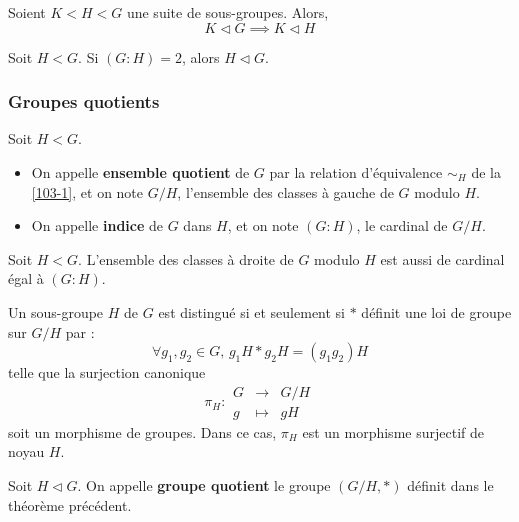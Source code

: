 	
	\begin{proposition}
		Soient $K < H < G$ une suite de sous-groupes. Alors,
		\[ K \lhd G \implies K \lhd H \]
	\end{proposition}
	
	
	\begin{proposition}
		Soit $H < G$. Si $(G:H) = 2$, alors $H \lhd G$.
	\end{proposition}
	
	\subsubsection{Groupes quotients}
	
	
	\begin{definition}
		Soit $H < G$.
		\begin{itemize}
			\item On appelle \textbf{ensemble quotient} de $G$ par la relation d'équivalence $\sim_H$ de la \cref{103-1}, et on note $G/H$, l'ensemble des classes à gauche de $G$ modulo $H$.
			\item On appelle \textbf{indice} de $G$ dans $H$, et on note $(G:H)$, le cardinal de $G/H$.
		\end{itemize}
	\end{definition}
	
	\begin{proposition}
		Soit $H < G$. L'ensemble des classes à droite de $G$ modulo $H$ est aussi de cardinal égal à $(G:H)$.
	\end{proposition}
	
	
	\begin{theorem}
		Un sous-groupe $H$ de $G$ est distingué si et seulement si $*$ définit une loi de groupe sur $G/H$ par :
		\[ \forall g_1, g_2 \in G, \, g_1 H * g_2 H = (g_1 g_2) H \]
		telle que la surjection canonique
		\[
			\pi_H :
			\begin{array}{ccc}
				G &\rightarrow& G/H \\
				g &\mapsto& gH
			\end{array}
		\]
		soit un morphisme de groupes. Dans ce cas, $\pi_H$ est un morphisme surjectif de noyau $H$.
	\end{theorem}
	
	\begin{definition}
		Soit $H \lhd G$. On appelle \textbf{groupe quotient} le groupe $(G/H, *)$ définit dans le théorème précédent.
	\end{definition}
	
